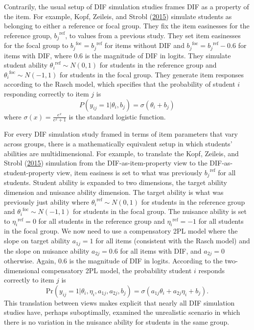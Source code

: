 \documentclass[
  11pt,
]{article}
\begin{document}
Contrarily, the usual setup of DIF simulation studies frames DIF as a property of the item. For example, Kopf, Zeileis, and Strobl (\protect\hyperlink{ref-kopf2015framework}{2015}) simulate students as belonging to either a reference or focal group. They fix the item easinesses for the reference group, \({b_j}^{\text{ref}}\), to values from a previous study. They set item easinesses for the focal group to \({b_j}^{\text{foc}} = {b_j}^{\text{ref}}\) for items without DIF and \({b_j}^{\text{foc}} = {b_j}^{\text{ref}} - 0.6\) for items with DIF, where 0.6 is the magnitude of DIF in logits. They simulate student ability \({\theta_i}^{\text{ref}} \sim N(0,1)\) for students in the reference group and \({\theta_i}^{\text{foc}} \sim N(-1,1)\) for students in the focal group. They generate item responses according to the Rasch model, which specifies that the probability of student \(i\) responding correctly to item \(j\) is \[P(y_{ij} = 1 | \theta_i, b_j) = \sigma(\theta_i + b_j)\] where \(\sigma(x) = \frac{e^x}{e^x + 1}\) is the standard logistic function.

For every DIF simulation study framed in terms of item parameters that vary across groups, there is a mathematically equivalent setup in which students' abilities are multidimensional. For example, to translate the Kopf, Zeileis, and Strobl (\protect\hyperlink{ref-kopf2015framework}{2015}) simulation from the DIF-as-item-property view to the DIF-as-student-property view, item easiness is set to what was previously \({b_j}^{\text{ref}}\) for all students. Student ability is expanded to two dimensions, the target ability dimension and nuisance ability dimension. The target ability is what was previously just ability where \({\theta_i}^{\text{ref}} \sim N(0,1)\) for students in the reference group and \({\theta_i}^{\text{foc}} \sim N(-1,1)\) for students in the focal group. The nuisance ability is set to \({\eta_i}^{\text{ref}} = 0\) for all students in the reference group and \({\eta_i}^{\text{ref}} = -1\) for all students in the focal group. We now need to use a compensatory 2PL model where the slope on target ability \(a_{1j} = 1\) for all items (consistent with the Rasch model) and the slope on nuisance ability \(a_{2j} = 0.6\) for all items with DIF, and \(a_{2j} = 0\) otherwise. Again, 0.6 is the magnitude of DIF in logits. According to the two-dimensional compensatory 2PL model, the probability student \(i\) responds correctly to item \(j\) is
\[
\text{Pr}(y_{ij} = 1 | \theta_i, \eta_i, a_{1j}, a_{2j}, b_j) = \sigma(a_{1j}\theta_i + a_{2j}\eta_i + b_j).
\]
This translation between views makes explicit that nearly all DIF simulation studies have, perhaps suboptimally, examined the unrealistic scenario in which there is no variation in the nuisance ability for students in the same group.
\end{document}
